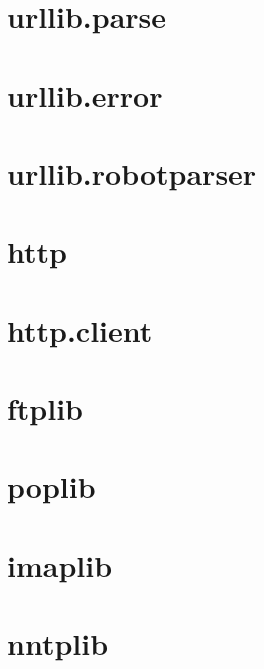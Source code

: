 \section{urllib.parse}






\section{urllib.error}





\section{urllib.robotparser}





\section{http}





\section{http.client}






\section{ftplib}






\section{poplib}







\section{imaplib}






\section{nntplib}







